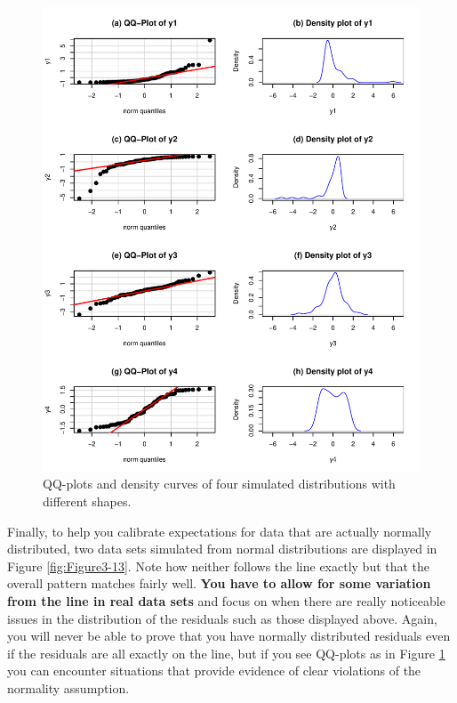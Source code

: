 \documentclass[]{book}
\begin{document}
\begin{figure}
\centering
\includegraphics{GreenwoodBanner_files/figure-latex/Figure3-12-1.pdf}
\caption{\label{fig:Figure3-12}QQ-plots and density curves of four simulated
distributions with different shapes.}
\end{figure}

Finally, to help you calibrate expectations for data that are actually
normally distributed, two data sets simulated from normal distributions
are displayed in Figure \ref{fig:Figure3-13}. Note how neither follows
the line exactly but that the overall pattern matches fairly well.
\textbf{You have to allow for some variation from the line in real data
sets} and focus on when there are really noticeable issues in the
distribution of the residuals such as those displayed above. Again, you
will never be able to prove that you have normally distributed residuals
even if the residuals are all exactly on the line, but if you see
QQ-plots as in Figure \ref{fig:Figure3-12} you can encounter situations
that provide evidence of clear violations of the normality assumption.
\end{document}
